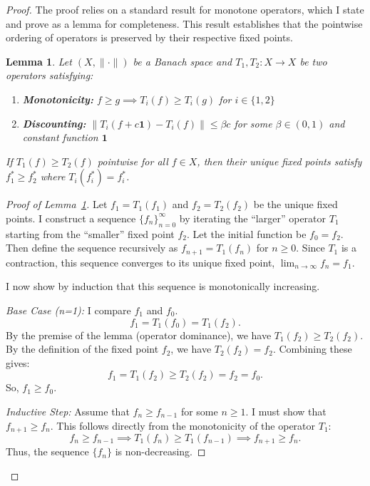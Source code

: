 \documentclass[12pt]{article}
\theoremstyle{plain}
\newtheorem{lemma}{Lemma}
\begin{document}
\begin{proof}
	The proof relies on a standard result for monotone operators, which I state and prove as a lemma for completeness. This result establishes that the pointwise ordering of operators is preserved by their respective fixed points.

	\begin{lemma}
		\label{lem:operator_dominance}
		Let $(X, \|\cdot\|)$ be a Banach space and $T_1, T_2: X \to X$ be two operators satisfying:
		\begin{enumerate}
			\item \textbf{Monotonicity:} $f \geq g \implies T_i(f) \geq T_i(g)$ for $i \in \{1,2\}$
			\item \textbf{Discounting:} $\|T_i(f+c\mathbf{1}) - T_i(f)\| \leq \beta c$ for some $\beta \in (0,1)$ and constant function $\mathbf{1}$
		\end{enumerate}
		If $T_1(f) \geq T_2(f)$ pointwise for all $f \in X$, then their unique fixed points satisfy $f_1^* \geq f_2^*$ where $T_i(f_i^*) = f_i^*$.
	\end{lemma}

	\begin{proof}[Proof of Lemma~\ref{lem:operator_dominance}]
		Let $f_1 = T_1(f_1)$ and $f_2 = T_2(f_2)$ be the unique fixed points.
		I construct a sequence $\{f_n\}_{n=0}^\infty$ by iterating the ``larger'' operator $T_1$ starting from the ``smaller'' fixed point $f_2$. Let the initial function be $f_0 = f_2$. Then define the sequence recursively as $f_{n+1} = T_1(f_n)$ for $n \ge 0$. Since $T_1$ is a contraction, this sequence converges to its unique fixed point, $\lim_{n \to \infty} f_n = f_1$.

		I now show by induction that this sequence is monotonically increasing.

		\textit{Base Case (n=1):}
		I compare $f_1$ and $f_0$.
		\begin{equation*}
			f_1 = T_1(f_0) = T_1(f_2).
		\end{equation*}
		By the premise of the lemma (operator dominance), we have $T_1(f_2) \ge T_2(f_2)$. By the definition of the fixed point $f_2$, we have $T_2(f_2) = f_2$. Combining these gives:
		\begin{equation*}
			f_1 = T_1(f_2) \ge T_2(f_2) = f_2 = f_0.
		\end{equation*}
		So, $f_1 \ge f_0$.

		\textit{Inductive Step:}
		Assume that $f_n \ge f_{n-1}$ for some $n \ge 1$. I must show that $f_{n+1} \ge f_n$.
		This follows directly from the monotonicity of the operator $T_1$:
		\begin{equation*}
			f_n \ge f_{n-1} \implies T_1(f_n) \ge T_1(f_{n-1}) \implies f_{n+1} \ge f_n.
		\end{equation*}
		Thus, the sequence $\{f_n\}$ is non-decreasing.


\end{proof}
\end{proof}
\end{document}
